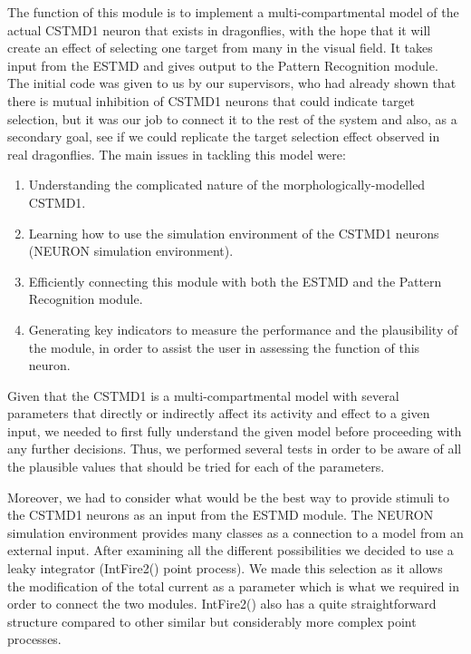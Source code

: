 \documentclass[a4paper,11pt]{article}
\begin{document}
The function of this module is to implement a multi-compartmental model of the actual CSTMD1 neuron that exists in dragonflies, with the hope that it will create an effect of selecting one target from many in the visual field. It takes input from the ESTMD and gives output to the Pattern Recognition module. The initial code was given to us by our supervisors, who had already shown that there is mutual inhibition of CSTMD1 neurons that could indicate target selection, but it was our job to connect it to the rest of the system and also, as a secondary goal, see if we could replicate the target selection effect observed in real dragonflies. The main issues in tackling this model were:
\begin{enumerate}
	\item Understanding the complicated nature of the morphologically-modelled CSTMD1.
	\item Learning how to use the simulation environment of the CSTMD1 neurons (NEURON simulation environment).\cite{neuron}
	\item Efficiently connecting this module with both the ESTMD and the Pattern Recognition module.
	\item Generating key indicators to measure the performance and the plausibility of the module, in order to assist the user in assessing the function of this neuron.
\end{enumerate}

Given that the CSTMD1 is a multi-compartmental model with several parameters that directly or indirectly affect its activity and effect to a given input, we needed to first fully understand the given model before proceeding with any further decisions. Thus, we performed several tests in order to be aware of all the plausible values that should be tried for each of the parameters.

Moreover, we had to consider what would be the best way to provide stimuli to the CSTMD1 neurons as an input from the ESTMD module. The NEURON simulation environment provides many classes as a connection to a model from an external input. After examining all the different possibilities we decided to use a leaky integrator (IntFire2() point process). We made this selection as it allows the modification of the total current as a parameter which is what we required in order to connect the two modules. IntFire2() also has a quite straightforward structure compared to other similar but considerably more complex point processes. 
\end{document}
